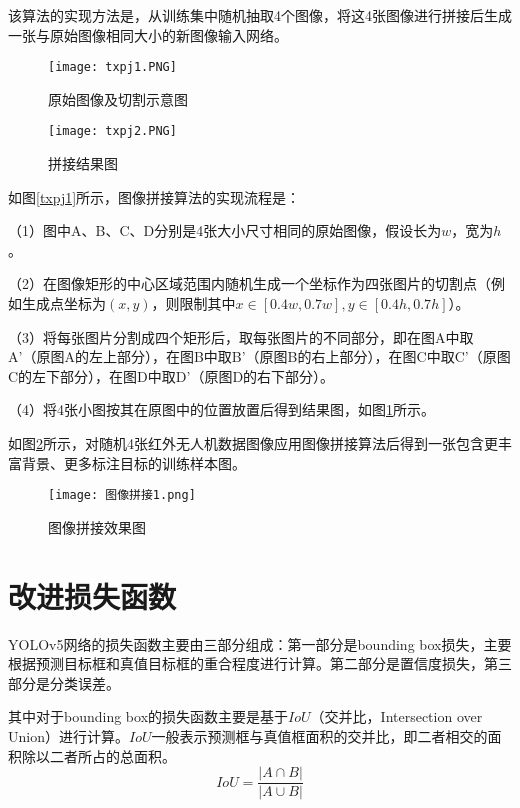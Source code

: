 该算法的实现方法是，从训练集中随机抽取4个图像，将这4张图像进行拼接后生成一张与原始图像相同大小的新图像输入网络。

\begin{figure}[htbp]
	\centering
	\begin{minipage}{0.49\linewidth}
		\centering
		\texttt{[image: txpj1.PNG]}
		\caption{原始图像及切割示意图}
		\label{txpj1}%
	\end{minipage}
	\begin{minipage}{0.49\linewidth}
		\centering
		\texttt{[image: txpj2.PNG]}
		\caption{拼接结果图}
		\label{txpj2}%
	\end{minipage}
\end{figure}

如图\ref{txpj1}所示，图像拼接算法的实现流程是：

（1）图中A、B、C、D分别是4张大小尺寸相同的原始图像，假设长为$w$，宽为$h$。

（2）在图像矩形的中心区域范围内随机生成一个坐标作为四张图片的切割点（例如生成点坐标为$(x,y)$，则限制其中$x\in[0.4w,0.7w],y\in[0.4h,0.7h]$）。

（3）将每张图片分割成四个矩形后，取每张图片的不同部分，即在图A中取A'（原图A的左上部分），在图B中取B'（原图B的右上部分），在图C中取C'（原图C的左下部分），在图D中取D'（原图D的右下部分）。

（4）将4张小图按其在原图中的位置放置后得到结果图，如图\ref{txpj2}所示。

如图\ref{txpj}所示，对随机4张红外无人机数据图像应用图像拼接算法后得到一张包含更丰富背景、更多标注目标的训练样本图。

\begin{figure}[htpb]
  \centering
  \texttt{[image: 图像拼接1.png]}
  \caption{图像拼接效果图}
  \label{txpj}
\end{figure}

\section{改进损失函数}
YOLOv5网络的损失函数主要由三部分组成：第一部分是bounding box损失，主要根据预测目标框和真值目标框的重合程度进行计算。第二部分是置信度损失，第三部分是分类误差。

其中对于bounding box的损失函数主要是基于$IoU$（交并比，Intersection over Union）进行计算。$IoU$一般表示预测框与真值框面积的交并比，即二者相交的面积除以二者所占的总面积。
\begin{equation}
  I o U=\frac{|A \cap B|}{|A \cup B|}
\end{equation}

